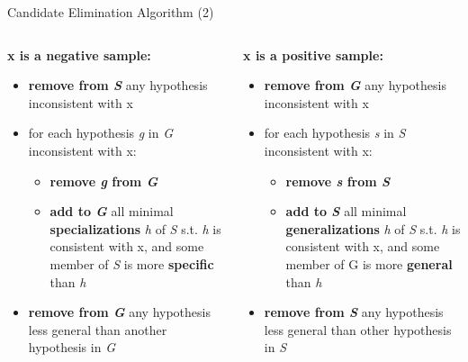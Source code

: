 \documentclass{beamer}
\begin{document}
\begin{frame}{Candidate Elimination Algorithm (2)}

\begin{columns}
\begin{column}{0.55\textwidth}
\textbf{\color{brown}x is a negative sample:}
\begin{itemize}
\item \textbf{remove from \emph{S}} any hypothesis inconsistent with x
\item for each hypothesis \emph{g} in \emph{G} inconsistent with x: 
  \begin{itemize}
  \item \textbf{remove \emph{g} from \emph{G}}
  \item \textbf{add to \emph{G}} all minimal \textbf{specializations} \emph{h} of \emph{S} s.t. \emph{h} is consistent with x, and some member of \emph{S} is more \textbf{specific} than \emph{h}
  \end{itemize}
\item \textbf{remove from \emph{G}} any hypothesis less general than another hypothesis in \emph{G}
\end{itemize}	
\end{column}
\begin{column}{0.55\textwidth}
\textbf{\color{blue}x is a positive sample:}
\begin{itemize}
\item \textbf{remove from \emph{G}} any hypothesis inconsistent with x
\item for each hypothesis \emph{s} in \emph{S} inconsistent with x:
	\begin{itemize}
	\item \textbf{remove \emph{s} from \emph{S}}
    \item \textbf{add to \emph{S}} all minimal \textbf{generalizations} \emph{h} of \emph{S} s.t. \emph{h} is consistent with x, and some member of G is more \textbf{general} than \emph{h}
	\end{itemize}
\item \textbf{remove from \emph{S}} any hypothesis less general than other hypothesis in \emph{S}
\end{itemize}
\end{column}
\end{columns}
\end{frame}
\end{document}
